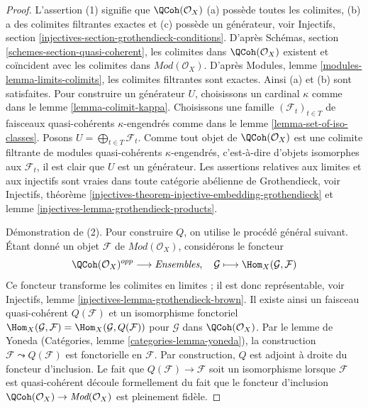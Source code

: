 \begin{proof}
L'assertion (1) signifie que $\QCoh(\mathcal{O}_X)$ (a) possède toutes les
colimites, (b) a des colimites filtrantes exactes et (c) possède un générateur,
voir Injectifs, section \ref{injectives-section-grothendieck-conditions}.
D'après Schémas, section \ref{schemes-section-quasi-coherent},
les colimites dans $\QCoh(\mathcal{O}_X)$ existent et coïncident
avec les colimites dans $\textit{Mod}(\mathcal{O}_X)$.
D'après Modules, lemme \ref{modules-lemma-limits-colimits},
les colimites filtrantes sont exactes. Ainsi (a) et (b) sont
satisfaites. Pour construire un générateur $U$, choisissons un cardinal $\kappa$ comme dans
le lemme \ref{lemma-colimit-kappa}. Choisissons une famille
$(\mathcal{F}_t)_{t \in T}$ de faisceaux quasi-cohérents $\kappa$-engendrés comme dans le
lemme \ref{lemma-set-of-iso-classes}. Posons
$U = \bigoplus_{t \in T} \mathcal{F}_t$. Comme tout objet de
$\QCoh(\mathcal{O}_X)$ est une colimite filtrante de modules quasi-cohérents $\kappa$-engendrés,
c'est-à-dire d'objets isomorphes aux $\mathcal{F}_t$,
il est clair que $U$ est un générateur.
Les assertions relatives aux limites et aux injectifs sont vraies
dans toute catégorie abélienne de Grothendieck,
voir Injectifs, théorème
\ref{injectives-theorem-injective-embedding-grothendieck} et
lemme \ref{injectives-lemma-grothendieck-products}.

\medskip\noindent
Démonstration de (2). Pour construire $Q$, on utilise le procédé général suivant.
Étant donné un objet $\mathcal{F}$ de $\textit{Mod}(\mathcal{O}_X)$,
considérons le foncteur
$$
\QCoh(\mathcal{O}_X)^{opp} \longrightarrow \textit{Ensembles},\quad
\mathcal{G} \longmapsto \Hom_X(\mathcal{G}, \mathcal{F})
$$
Ce foncteur transforme les colimites en limites ;
il est donc représentable,
voir Injectifs, lemme \ref{injectives-lemma-grothendieck-brown}.
Il existe ainsi un faisceau quasi-cohérent $Q(\mathcal{F})$
et un isomorphisme fonctoriel
$\Hom_X(\mathcal{G}, \mathcal{F}) = \Hom_X(\mathcal{G}, Q(\mathcal{F}))$
pour $\mathcal{G}$ dans $\QCoh(\mathcal{O}_X)$. Par le lemme de
Yoneda (Catégories, lemme \ref{categories-lemma-yoneda}),
la construction $\mathcal{F} \leadsto Q(\mathcal{F})$ est
fonctorielle en $\mathcal{F}$. Par construction, $Q$ est
adjoint à droite du foncteur
d'inclusion. Le fait que $Q(\mathcal{F}) \to \mathcal{F}$ soit un isomorphisme
lorsque $\mathcal{F}$ est quasi-cohérent découle formellement du fait
que le foncteur d'inclusion
$\QCoh(\mathcal{O}_X) \to \textit{Mod}(\mathcal{O}_X)$
est pleinement fidèle.
\end{proof}







